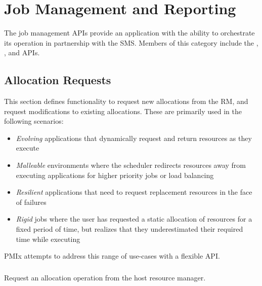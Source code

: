 \chapter{Job Management and Reporting}
\label{chap:api_job_mgmt}

The job management \acp{API} provide an application with the ability to orchestrate its operation in partnership with the \ac{SMS}.
Members of this category include the , , and  \acp{API}.

\section{Allocation Requests}
\label{chap:api_job_mgmt:alloc}

This section defines functionality to request new allocations from the \ac{RM}, and request modifications to existing allocations.
These are primarily used in the following scenarios:
\begin{itemize}
\item \textit{Evolving} applications that dynamically request and return resources as they execute
\item \textit{Malleable} environments where the scheduler redirects resources away from executing applications for higher priority jobs or load balancing
\item \textit{Resilient} applications that need to request replacement resources in the face of failures
\item \textit{Rigid} jobs where the user has requested a static allocation of resources for a fixed period of time, but realizes that they underestimated their required time while executing
\end{itemize}
\ac{PMIx} attempts to address this range of use-cases with a flexible \ac{API}.

\subsection{}

\summary

Request an allocation operation from the host resource manager.

